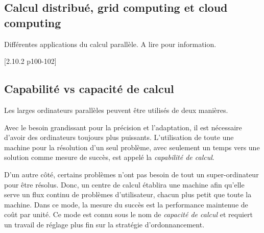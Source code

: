 	\subsection{Calcul distribué, grid computing et cloud computing}
	Différentes applications du calcul parallèle. A lire pour information.
	
	[2.10.2 p100-102]
	
	\subsection{Capabilité vs capacité de calcul}
	Les larges ordinateurs parallèles peuvent être utilisés de deux manières.
	
	Avec le besoin grandissant pour la précision et l'adaptation, il est nécessaire d'avoir des ordinateurs toujours plus puissants. L'utilisation de toute une machine pour la résolution d'un seul problème, avec seulement un temps vers une solution comme mesure de succès, est appelé la \textit{capabilité de calcul}.
	
	D'un autre côté, certains problèmes n'ont pas besoin de tout un super-ordinateur pour être résolus. Donc, un centre de calcul établira une machine afin qu'elle serve un flux continu de problèmes d'utilisateur, chacun plus petit que toute la machine. Dans ce mode, la mesure du succès est la performance maintenue de coût par unité. Ce mode est connu sous le nom de \textit{capacité de calcul} et requiert un travail de réglage plus fin sur la stratégie d'ordonnancement. 